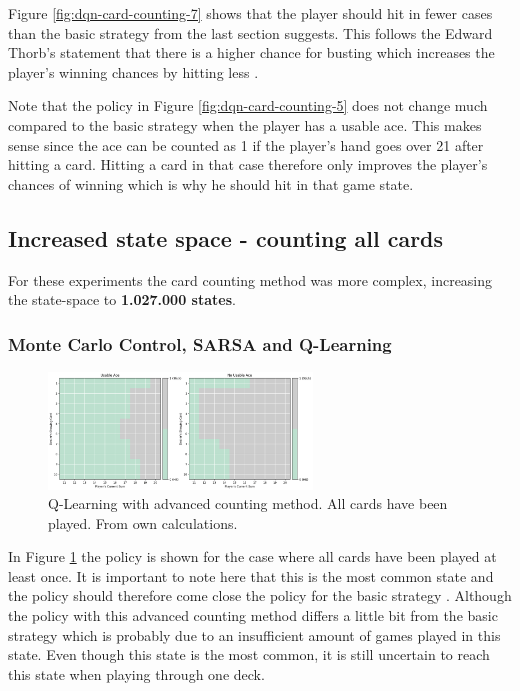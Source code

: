 \documentclass[conference]{IEEEtran}
\begin{document}
Figure \ref{fig:dqn-card-counting-7} shows that the player should hit in fewer cases than the basic strategy from the last section suggests.
This follows the Edward Thorb's statement that there is a higher chance for busting which increases the player's winning chances by hitting less \cite{b1}.

Note that the policy in Figure \ref{fig:dqn-card-counting-5} does not change much compared to the basic strategy when the player has a usable ace. 
This makes sense since the ace can be counted as 1 if the player's hand goes over 21 after hitting a card.
Hitting a card in that case therefore only improves the player's chances of winning which is why he should hit in that game state. 


\subsection{Increased state space - counting all cards}
For these experiments the card counting method was more complex, increasing the state-space to \textbf{1.027.000 states}. 
\subsubsection{Monte Carlo Control, SARSA and Q-Learning}

\begin{figure}
	\centering
	\includegraphics[width=70mm]{figures/Q-Learning/advanced-counting-10-million/policy-all-cards-played-1111111111.png}
	\caption{Q-Learning with advanced counting method. All cards have been played. From own calculations.}
	\label{fig:q-learning-advanced-all-cards-played}
\end{figure}

In Figure \ref{fig:q-learning-advanced-all-cards-played} the policy is shown for the case where all cards have been played at least once.
It is important to note here that this is the most common state and the policy should therefore come close the policy for the basic strategy \cite{b1}.
Although the policy with this advanced counting method differs a little bit from the basic strategy which is probably due to an insufficient amount of games played in this state.
Even though this state is the most common, it is still uncertain to reach this state when playing through one deck.
\end{document}
